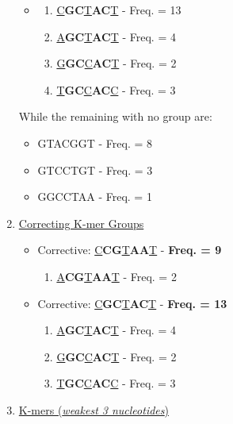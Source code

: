 \documentclass[12pt,openany]{llncs}
\begin{document}
\begin{figure}
\begin{bordered}
\begin{enumerate}
\begin{itemize}
\begin{enumerate}
	  \end{enumerate}
	\end{itemize}
	\begin{itemize}
	  \item 
	  \begin{enumerate}
		\item \underline{C}\textbf{GC}\underline{T}\textbf{AC}\underline{T} - Freq. = 13
		\item \underline{A}\textbf{GC}\underline{T}\textbf{AC}\underline{T} - Freq. = 4
		\item \underline{G}\textbf{GC}\underline{C}\textbf{AC}\underline{T} - Freq. = 2
		\item \underline{T}\textbf{GC}\underline{C}\textbf{AC}\underline{C} - Freq. = 3
	  \end{enumerate}
	\end{itemize}
	While the remaining with no group are:
	\begin{itemize}
		\item GTACGGT - Freq. = 8
		\item GTCCTGT - Freq. = 3
		\item GGCCTAA - Freq. = 1
	\end{itemize}
	\item \underline{Correcting K-mer Groups}
     \begin{itemize}
	  \item Corrective: \underline{C}\textbf{CG}\underline{T}\textbf{AA}\underline{T} - \textbf{Freq. = 9}
	  \begin{enumerate}
		\item \underline{A}\textbf{CG}\underline{T}\textbf{AA}\underline{T} - Freq. = 2
	  \end{enumerate}
	\end{itemize}
	\begin{itemize}
	  \item Corrective: \underline{C}\textbf{GC}\underline{T}\textbf{AC}\underline{T} - \textbf{Freq. = 13}
	  \begin{enumerate}
		\item \underline{A}\textbf{GC}\underline{T}\textbf{AC}\underline{T} - Freq. = 4
		\item \underline{G}\textbf{GC}\underline{C}\textbf{AC}\underline{T} - Freq. = 2
		\item \underline{T}\textbf{GC}\underline{C}\textbf{AC}\underline{C} - Freq. = 3
	  \end{enumerate}
	\end{itemize}
	\item \underline{K-mers (\textit{weakest 3 nucleotides})}

\end{enumerate}
\end{bordered}
\end{figure}
\end{document}
